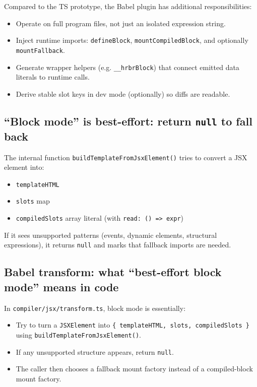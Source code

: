 Compared to the TS prototype, the Babel plugin has additional responsibilities:

\begin{itemize}
\item Operate on full program files, not just an isolated expression string.
\item Inject runtime imports: \texttt{defineBlock}, \texttt{mountCompiledBlock}, and optionally \texttt{mountFallback}.
\item Generate wrapper helpers (e.g. \texttt{\_\_hrbrBlock}) that connect emitted data literals to runtime calls.
\item Derive stable slot keys in dev mode (optionally) so diffs are readable.
\end{itemize}

\subsection{``Block mode'' is best-effort: return \texttt{null} to fall back}

The internal function \texttt{buildTemplateFromJsxElement()} tries to convert a JSX element into:

\begin{itemize}
\item \texttt{templateHTML}
\item \texttt{slots} map
\item \texttt{compiledSlots} array literal (with \texttt{read: () => expr})
\end{itemize}

If it sees unsupported patterns (events, dynamic elements, structural expressions), it returns \texttt{null} and marks that fallback imports are needed.

\subsection{Babel transform: what ``best-effort block mode'' means in code}

In \texttt{compiler/jsx/transform.ts}, block mode is essentially:

\begin{itemize}
\item Try to turn a \texttt{JSXElement} into \texttt{\{ templateHTML, slots, compiledSlots \}} using \texttt{buildTemplateFromJsxElement()}.
\item If any unsupported structure appears, return \texttt{null}.
\item The caller then chooses a fallback mount factory instead of a compiled-block mount factory.
\end{itemize}

